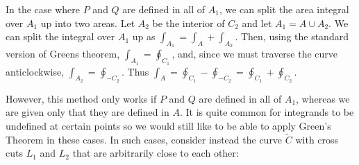 \documentclass[../main.tex]{subfiles}
\begin{document}
In the case where $P$ and $Q$ are defined in all of $A_1$, we can split the area integral over $A_1$ up into two areas.
Let $A_2$ be the interior of $C_2$ and let $A_1 = A \cup A_2$.
We can split the integral over $A_1$ up as $\int_{A_1} =  \int_{A} + \int_{A_2}$.
Then, using the standard version of Greens theorem, $\int_{A_1} = \oint_{C_1}$, and, since we must traverse the curve anticlockwise, $\int_{A_2} = \oint_{-C_2}$.
Thus $\int_{A} = \oint_{C_1} - \oint_{-C_2} = \oint_{C_1} + \oint_{C_2}$.

However, this method only works if $P$ and $Q$ are defined in all of $A_1$, whereas we are given only that they are defined in $A$.
It is quite common for integrands to be undefined at certain points so we would still like to be able to apply Green's Theorem in these cases.
In such cases, consider instead the curve $\widetilde{C}$ with cross cuts $L_1$ and $L_2$ that are arbitrarily close to each other:
\end{document}
